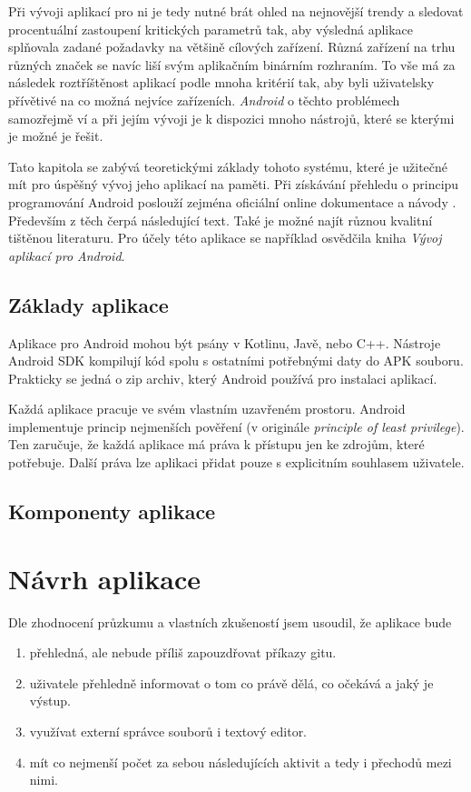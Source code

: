 Při vývoji aplikací pro ni je tedy nutné brát ohled na nejnovější trendy a sledovat procentuální zastoupení kritických parametrů tak, aby výsledná aplikace splňovala zadané požadavky na většině cílových zařízení. Různá zařízení na trhu různých značek se navíc liší svým aplikačním binárním rozhraním. To vše má za následek roztříštěnost aplikací podle mnoha kritérií tak, aby byli uživatelsky přívětivé na co možná nejvíce zařízeních. \emph{Android} o těchto problémech samozřejmě ví a při jejím vývoji je k dispozici mnoho nástrojů, které se kterými je možné je řešit.

Tato kapitola se zabývá teoretickými základy tohoto systému, které je užitečné mít pro úspěšný vývoj jeho aplikací na paměti. Při získávání přehledu o principu programování Android poslouží zejména oficiální online dokumentace a návody . Především z těch čerpá následující text. Také je možné najít různou kvalitní tištěnou literaturu. Pro účely této aplikace se například osvědčila kniha \emph{Vývoj aplikací pro Android}\cite{android-Lacko}. 

\section{Základy aplikace}
Aplikace pro Android mohou být psány v Kotlinu, Javě, nebo C++. Nástroje Android SDK kompilují kód spolu s ostatními potřebnými daty do APK souboru. Prakticky se jedná o zip archiv, který Android používá pro instalaci aplikací.

Každá aplikace pracuje ve svém vlastním uzavřeném prostoru. Android implementuje princip nejmenších pověření (v originále \emph{principle of least privilege}). Ten zaručuje, že každá aplikace má práva k přístupu jen ke zdrojům, které potřebuje. Další práva lze aplikaci přidat pouze s explicitním souhlasem uživatele.

\section{Komponenty aplikace}


\chapter{Návrh aplikace}
Dle zhodnocení průzkumu a vlastních zkušeností jsem usoudil, že aplikace bude
\begin{enumerate}
    \item přehledná, ale nebude příliš zapouzdřovat příkazy gitu.
    \item uživatele přehledně informovat o tom co právě dělá, co očekává a jaký je výstup.
    \item využívat externí správce souborů i textový editor.
    \item mít co nejmenší počet za sebou následujících aktivit a tedy i přechodů mezi nimi.
\end{enumerate}


